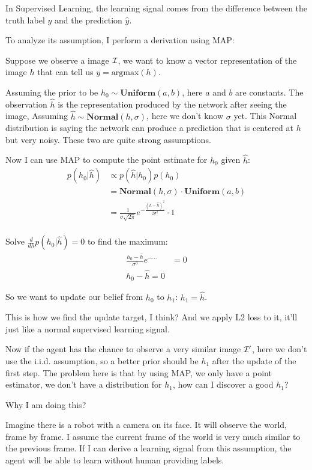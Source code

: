 In Supervised Learning, the learning signal comes from the difference between the truth label $y$ and the prediction $\hat{y}$.

To analyze its assumption, I perform a derivation using MAP:

Suppose we observe a image $\cal{I}$, we want to know a vector representation of the image $h$ that can tell us $y=\text{argmax}(h)$.

Assuming the prior to be $h_0 \sim \textbf{Uniform}(a,b)$, here $a$ and $b$ are constants.
The observation $\hat{h}$ is the representation produced by the network after seeing the image,
Assuming $\hat{h} \sim \textbf{Normal}(h, \sigma)$, here we don't know $\sigma$ yet.
This Normal distribution is saying the network can produce a prediction that is centered at $h$ but very noisy.
These two are quite strong assumptions.

Now I can use MAP to compute the point estimate for $h_0$ given $\hat{h}$:
\begin{align*}
    p(h_0|\hat{h}) &\propto p(\hat{h}|h_0) p(h_0)\\
    &= \textbf{Normal}(h,\sigma) \cdot \textbf{Uniform}(a,b) \\
    &= \frac{1}{\sigma \sqrt{2 \pi}} e^{-\frac{(h-\hat{h})^2}{2\sigma^2}} \cdot 1\\
\end{align*}

Solve $\frac{d}{dh}p(h_0|\hat{h})=0$ to find the maximum:
\begin{align*}
    \frac{h_0-\hat{h}}{\sigma^3} e^{-\cdots} &= 0\\
    h_0-\hat{h} = 0
\end{align*}

So we want to update our belief from $h_0$ to $h_1$: $h_1 = \hat{h}$.

This is how we find the update target, I think?
And we apply L2 loss to it, it'll just like a normal supervised learning signal.

Now if the agent has the chance to observe a very similar image $\cal{I}'$, here we don't use the i.i.d. assumption,
so a better prior should be $h_1$ after the update of the first step.
The problem here is that by using MAP, we only have a point estimator, 
we don't have a distribution for $h_1$, how can I discover a good $h_1$?

Why I am doing this?

Imagine there is a robot with a camera on its face.
It will observe the world, frame by frame.
I assume the current frame of the world is very much similar to the previous frame.
If I can derive a learning signal from this assumption,
the agent will be able to learn without human providing labels.

